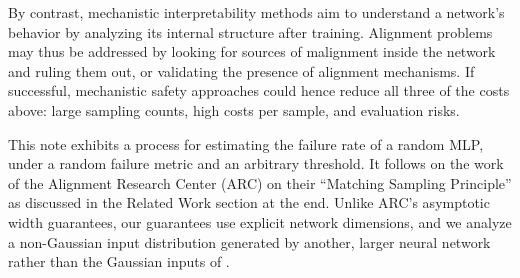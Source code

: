 \documentclass[10pt]{article}
\newcommand{\bst}{\hyperref[thm:main]{Beating Sampling Theorem}}
\begin{document}
By contrast, mechanistic interpretability methods aim to understand a network's behavior by analyzing its internal structure after training. Alignment problems may thus be addressed by looking for sources of malignment inside the network and ruling them out, or validating the presence of alignment mechanisms. If successful, mechanistic safety approaches could hence reduce all three of the costs above: large sampling counts, high costs per sample, and evaluation risks.

This note exhibits a process for estimating the failure rate of a random MLP, under a random failure metric and an arbitrary threshold.  It follows on the work of the Alignment Research Center (ARC) on their ``Matching Sampling Principle'' \citep{arc-2025-competing,arc-2026-wide-mlps} as discussed in the Related Work section at the end.  Unlike ARC's asymptotic width guarantees, our guarantees use explicit network dimensions, and we analyze a non-Gaussian input distribution generated by another, larger neural network rather than the Gaussian inputs of \citet{arc-2026-wide-mlps}.

\newcommand{\sizestable}{%
\setlength{\tabcolsep}{2.4pt}%
\begin{tabular}{@{}lrrrrr@{}}
\toprule
Network & $n$ & $h$ & $\ell$ & $n'$ & Parameters \\
\midrule
Kimi K3 MLPs (routed experts)~\citep{kimi-2026-k3} & $3{,}584$ & $2{,}752{,}512$ & $1$ & $3{,}584$ & $2.8\cdot10^{12}$ \\
GLM-5.3 MLPs~\citep{zai-2026-glm53} & $6{,}144$ & $524{,}288$ & $1$ & $6{,}144$ & $7.53\cdot10^{11}$ \\
DeepSeek V4 Pro MLPs~\citep{deepseek-2026-v4} & $7{,}168$ & $1{,}179{,}648$ & $1$ & $7{,}168$ & $1.6\cdot10^{12}$ \\
Qwen3.8-2.4T-A95B MLPs~\citep{qwen-2026-38} & $8{,}192$ & $1{,}048{,}576$ & $1$ & $8{,}192$ & $2.4\cdot10^{12}$ \\
Muse Spark Open MLPs~\citep{meta-2026-muse} & $4{,}096$ & $1{,}048{,}576$ & $1$ & $4{,}096$ & $8.16\cdot10^{11}$ \\
\midrule
\textbf{\bst, Agent ($\boldsymbol{A}$)} & $\boldsymbol{8{,}000}$ & $\boldsymbol{64{,}000{,}000}$ & $\boldsymbol{2}$ & $\boldsymbol{8{,}000}$ & $\boldsymbol{4.1\cdot10^{15}}$ \\
\textbf{\bst, World ($\boldsymbol{W}$)} & $\boldsymbol{16{,}000}$ & $\boldsymbol{4.58\cdot10^{13}}$ & $\boldsymbol{2}$ & $\boldsymbol{8{,}000}$ & $\boldsymbol{2.1\cdot10^{27}}$ \\
\bottomrule
\end{tabular}}
\end{document}
